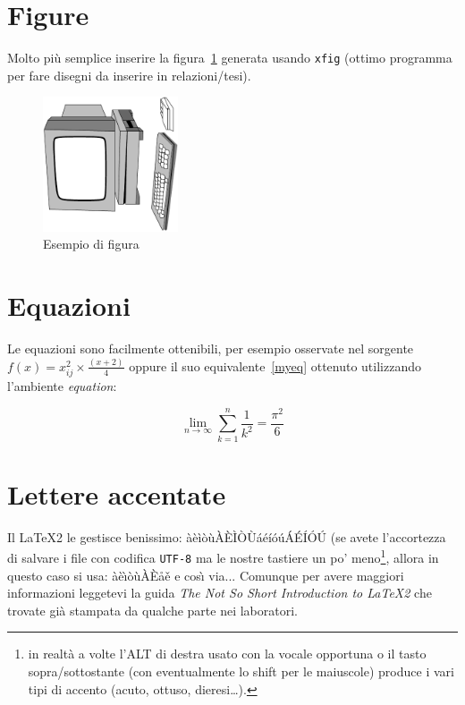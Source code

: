 \section{Figure}
   Molto pi\`u semplice inserire la figura~\ref{miafigura}
   generata usando \texttt{xfig} (ottimo programma
   per fare disegni da inserire in relazioni/tesi). 
   \begin{figure}
   \centering
   \includegraphics[width=4cm]{images/esempio}
   \caption{Esempio di figura\label{miafigura}}
   \end{figure}

\section{Equazioni}
   Le equazioni sono facilmente ottenibili, per esempio
   osservate nel sorgente $f(x)=x^{2}_{ij}\times \frac{(x+2)}{4}$
   oppure il suo equivalente~\ref{myeq} ottenuto utilizzando l'ambiente
   \emph{equation}:

   \begin{equation}
   \lim_{n \to \infty}
   \sum_{k=1}^n \frac{1}{k^2}
   = \frac{\pi^2}{6}
   \label{myeq}
   \end{equation}

\section{Lettere accentate\label{accenti}}

   Il \LaTeX2\/
   le gestisce benissimo: àèìòùÀÈÌÒÙáéíóúÁÉÍÓÚ (se avete l'accortezza di salvare i file con codifica \texttt{UTF-8}
   ma le nostre tastiere un po' meno\footnote{in realt\`a a volte l'ALT di destra
   usato con la vocale opportuna o il tasto sopra/sottostante (con eventualmente lo
   shift per le maiuscole) produce i vari tipi di accento (acuto, ottuso, dieresi\ldots).},
   allora in questo caso si usa:
   \`a\`e\`{\i}\`o\`u\`A\`E\aa\v e e cos\`{\i} via...
   \newpage
   Comunque per avere maggiori informazioni leggetevi la guida \emph{The Not So Short Introduction to \LaTeX2}
   che trovate già stampata da qualche parte nei laboratori.

